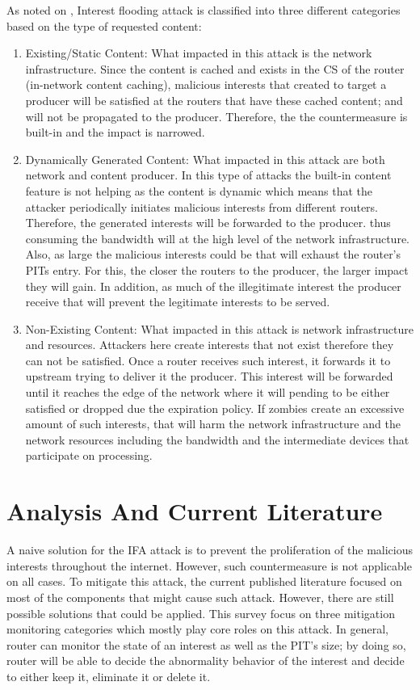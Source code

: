 \documentclass[conference]{IEEEtran}
\begin{document}
As noted on \cite{Gasti2013}, Interest flooding attack is classified into three different categories based on the type of requested content: 
\begin{enumerate}

        \item Existing/Static Content: What impacted in this attack is the network infrastructure. Since the content is cached and exists in the CS of the router (in-network content caching), malicious interests that created to target a producer will be satisfied at the routers that have these cached content; and will not be propagated to the producer. Therefore, the the countermeasure is built-in and the impact is narrowed.  
        \item Dynamically Generated Content: What impacted in this attack are both network and content producer. In this type of attacks the built-in content feature is not helping as the content is dynamic which means that the attacker periodically initiates malicious interests from different routers. Therefore, the generated interests will be forwarded to the producer. thus consuming the bandwidth will at the high level of the network infrastructure. Also, as large the malicious interests could be that will exhaust the router's PITs entry. For this, the closer the routers to the producer, the larger impact they will gain. In addition, as much of the illegitimate interest the producer receive that will prevent the legitimate interests to be served.        
        \item Non-Existing Content: What impacted in this attack is network infrastructure and resources. Attackers here create interests that not exist therefore they can not be satisfied. Once a router receives such interest, it forwards it to upstream trying to deliver it the producer. This interest will be forwarded until it reaches the edge of the network where it will pending to be either satisfied or dropped due the expiration policy. If zombies create an excessive amount of such interests, that will harm the network infrastructure and the network resources including the bandwidth and the intermediate devices that participate on processing.          


\end{enumerate}


\section{Analysis And Current Literature}
A naive solution for the IFA attack is to prevent the proliferation of the malicious interests throughout the internet. However, such countermeasure is not applicable on all cases. To mitigate this attack, the current published literature focused on most of the components that might cause such attack. However, there are still possible solutions that could be applied. This survey focus on three mitigation monitoring categories which mostly play core roles on this attack. In general, router can monitor the state of an interest as well as the PIT's size; by doing so, router will be able to decide the abnormality behavior of the interest and decide to either keep it, eliminate it or delete it.   
\end{document}
